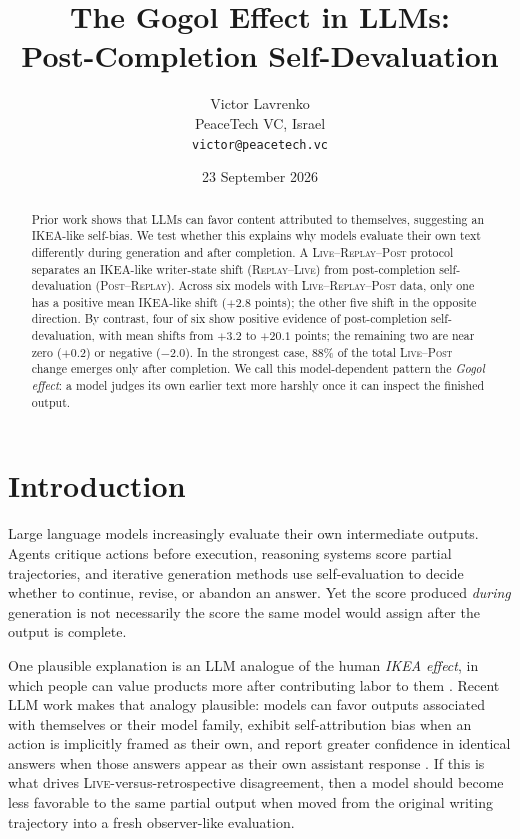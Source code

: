 \documentclass[10pt]{article}
\title{\textbf{The Gogol Effect in LLMs:}\\[2pt]\large Post-Completion Self-Devaluation}
\author{Victor Lavrenko\\PeaceTech VC, Israel\\\texttt{victor@peacetech.vc}}
\date{23 September 2026}
\newcommand{\live}{\textsc{Live}}
\newcommand{\replay}{\textsc{Replay}}
\newcommand{\post}{\textsc{Post}}
\newcommand{\papersection}[1]{\Needspace{4.4\baselineskip}\section{#1}}
\begin{document}
\twocolumn[
\begin{@twocolumnfalse}
\maketitle
\vspace{-1.7em}
\end{@twocolumnfalse}
]
\begin{abstract}
Prior work shows that LLMs can favor content attributed to themselves, suggesting an IKEA-like self-bias. We test whether this explains why models evaluate their own text differently during generation and after completion. A \live{}--\replay{}--\post{} protocol separates an IKEA-like writer-state shift (\replay{}--\live{}) from post-completion self-devaluation (\post{}--\replay{}). Across six models with \live{}--\replay{}--\post{} data, only one has a positive mean IKEA-like shift ($+2.8$ points); the other five shift in the opposite direction. By contrast, four of six show positive evidence of post-completion self-devaluation, with mean shifts from $+3.2$ to $+20.1$ points; the remaining two are near zero ($+0.2$) or negative ($-2.0$). In the strongest case, 88\% of the total \live{}--\post{} change emerges only after completion. We call this model-dependent pattern the \emph{Gogol effect}: a model judges its own earlier text more harshly once it can inspect the finished output.
\end{abstract}
\vspace{0.4em}

\papersection{Introduction}
Large language models increasingly evaluate their own intermediate outputs. Agents critique actions before execution, reasoning systems score partial trajectories, and iterative generation methods use self-evaluation to decide whether to continue, revise, or abandon an answer. Yet the score produced \emph{during} generation is not necessarily the score the same model would assign after the output is complete.

One plausible explanation is an LLM analogue of the human \emph{IKEA effect}, in which people can value products more after contributing labor to them \citep{norton2012ikea}. Recent LLM work makes that analogy plausible: models can favor outputs associated with themselves or their model family, exhibit self-attribution bias when an action is implicitly framed as their own, and report greater confidence in identical answers when those answers appear as their own assistant response \citep{panickssery2024recognize,xu2024pride,khullar2026selfattribution,sanzguerrero2026ownership}. If this is what drives \live{}-versus-retrospective disagreement, then a model should become less favorable to the same partial output when moved from the original writing trajectory into a fresh observer-like evaluation.
\end{document}

